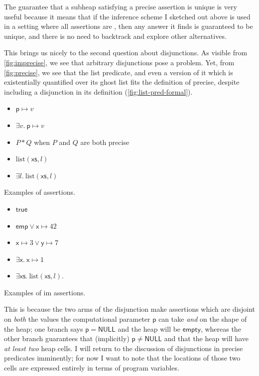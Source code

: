 The guarantee that a subheap satisfying a precise assertion is unique is very
useful because it means that if the inference scheme I sketched out above is
used in a setting where all assertions are , then any answer it
finds is guaranteed to be unique, and there is no need to backtrack and explore
other alternatives.

This brings us nicely to the second question about disjunctions. As visible
from \cref{fig:imprecise}, we see that arbitrary disjunctions pose a problem.
Yet, from \cref{fig:precise}, we see that the list predicate, and even a
version of it which is existentially quantified over its ghost list fits the
definition of precise, despite including a disjunction in its definition
(\cref{fig:list-pred-formal}).

\begin{marginfigure}
\begin{itemize}
    \item $\mathsf{p} \mapsto{} v$
    \item $\exists v.\ \mathsf{p} \mapsto{} v$
    \item $P \ast{} Q$ when $P$ and $Q$ are both precise
    \item $\mathrm{list}(\mathsf{xs}, l)$
    \item $\exists l.\ \mathrm{list}(\mathsf{xs}, l)$
\end{itemize}
\caption{Examples of  assertions.}\label{fig:precise}
\end{marginfigure}

\begin{marginfigure}
\begin{itemize}
    \item $\mathsf{true}$
    \item $\mathsf{emp} \vee{} \mathsf{x} \mapsto{} 42$
    \item $\mathsf{x} \mapsto{} 3 \vee{} \mathsf{y} \mapsto{} 7$
    \item $\exists \mathsf{x}.\ \mathsf{x} \mapsto{} 1$
    \item $\exists \mathsf{xs}.\ \mathrm{list}(\mathsf{xs}, l)$.
\end{itemize}
\caption{Examples of im assertions.}\label{fig:imprecise}
\end{marginfigure}

This is because the two arms of the disjunction make assertions
which are disjoint on \emph{both} the values the computational parameter
$\mathsf{p}$ can take \emph{and} on the shape of the heap; one branch says
$\mathsf{p} = \mathsf{NULL}$ and the heap will be $\mathsf{empty}$, whereas the
other branch guarantees that (implicitly) $\mathsf{p} \neq \mathsf{NULL}$ and
that the heap will have \emph{at least two} heap cells. I will return to the
discussion of disjunctions in precise predicates imminently; for now I want to
note that the locations of those two cells are expressed entirely in terms of
program variables.

